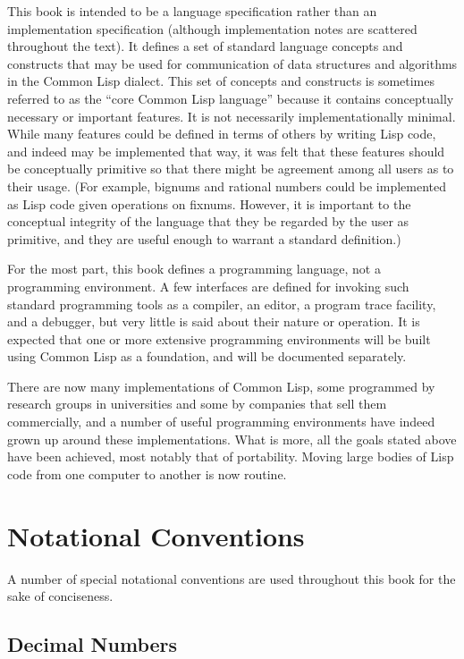 This book is intended to be a language specification
rather than an implementation specification
(although implementation notes are scattered throughout the text).
It defines a set of
standard language concepts and constructs that may be used
for communication of data structures and algorithms in the Common Lisp
dialect.  This set of concepts
and constructs is sometimes referred to as the ``core Common Lisp language''
because it contains conceptually necessary or important features.
It is not necessarily implementationally minimal.
While many features could be defined in terms of others
by writing Lisp code, and indeed may be implemented that way,
it was felt that these features should be conceptually primitive
so that there might be agreement among all users as to their usage.
(For example, bignums and rational numbers could be implemented as
Lisp code given operations on fixnums.  However, it is important
to the conceptual integrity of the language that they be regarded
by the user as primitive, and they are useful enough to warrant
a standard definition.)

For the most part, this book defines a programming language, not a
programming environment.  A few interfaces are defined for
invoking such standard programming tools as a compiler, an editor,
a program trace facility, and a debugger, but very little is said
about their nature or operation.  It is expected that one or more
extensive programming environments will be built using Common Lisp as a
foundation, and will be documented separately.

There are now many implementations of Common Lisp,
some programmed by research groups in universities
and some by companies that sell them commercially,
and a number of useful
programming environments have indeed grown up around
these implementations.
What is more, all the goals stated above have been achieved,
most notably that of portability.  Moving large bodies
of Lisp code from one computer to another is now routine.

\section{Notational Conventions}

A number of special notational conventions are used throughout this book
for the sake of conciseness.

\subsection{Decimal Numbers}

